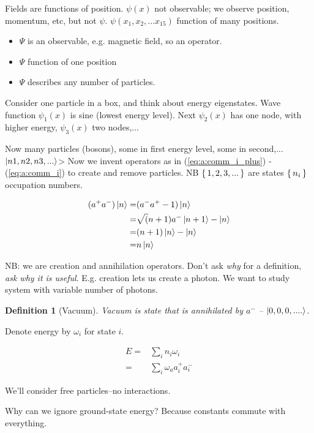 \documentclass[]{article}
\newtheorem{defn}[thm]{Definition}
\begin{document}
Fields are functions of position. $\psi(x)$ not observable; we observe position, momentum, etc, but not $\psi$. $\psi(x_1,x_2,...x_{15})$ function of many positions.

\begin{itemize}
	\item $\Psi$ is an observable, e.g. magnetic field, so an operator.
	\item $\Psi$ function of one position
	\item $\Psi$ describes any number of particles.
\end{itemize}


Consider one particle in a box, and think about energy eigenstates. Wave function $\psi_1(x)$ is sine (lowest energy level). Next $\psi_2(x)$ has one node, with higher energy, $\psi_3(x)$ two nodes,...

Now many particles (bosons), some in first energy level, some in second,...$\ket{n1,n2,n3,...}$> Now we invent operators as in (\ref{eq:a:comm_i_plus}) - (\ref{eq:a:comm_i}) to create and remove particles. NB $\set{1,2,3,...}$ are states $\set{n_i}$ occupation numbers.

\begin{align*}
(a^+a^-)\ket{n}=&(a^-a^+-1)\ket{n}\\
=&\sqrt(n+1)a^-\ket{n+1}-\ket{n}\\
=&(n+1)\ket{n}-\ket{n}\\
=&n\ket{n}
\end{align*}

NB: we are  creation and annihilation operators. Don't ask \emph{why} for a definition, \emph{ask why it is useful}. E.g. creation lets us create a photon. We want to study system with variable number of photons.

\begin{defn}[Vacuum]
	Vacuum is state that is annihilated by $a^-$ -- $\ket{0,0,0,....}$.
\end{defn}

Denote energy by $\omega_i$ for state $i$. 

\begin{align*}
E =& \sum_{i} n_i \omega_i\\
=& \sum_{i} \omega_a a^+_i a^-_i 
\end{align*}

We'll consider free particles--no interactions.

Why can we ignore ground-state energy? Because constants commute with everything. 
\end{document}
